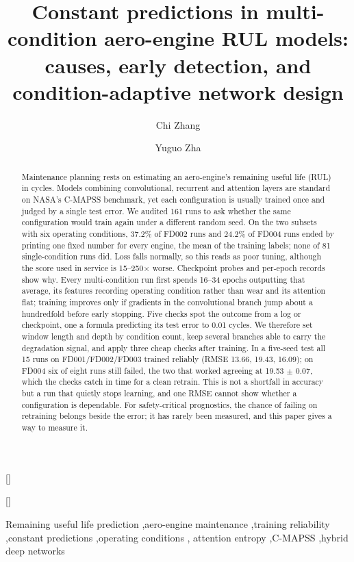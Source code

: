 
\title[mode=title]{Constant predictions in multi-condition aero-engine RUL
models: causes, early detection, and condition-adaptive network design}

\author[1]{Chi Zhang}[]
\author[1]{Yuguo Zha}[]
\cormark[1]


\begin{abstract}
Maintenance planning rests on estimating an aero-engine's remaining useful
life (RUL) in cycles. Models combining convolutional, recurrent and
attention layers are standard on NASA's C-MAPSS benchmark, yet each
configuration is usually trained once and judged by a single test error.
We audited 161 runs to ask whether the same configuration would train again
under a different random seed. On the two subsets with six operating
conditions, 37.2\% of FD002 runs and 24.2\% of FD004 runs ended by printing
one fixed number for every engine, the mean of the training labels; none of
81 single-condition runs did. Loss falls normally, so this reads as poor
tuning, although the score used in service is 15--250$\times$ worse.
Checkpoint probes and per-epoch records show why. Every multi-condition run
first spends 16--34 epochs outputting that average, its features recording
operating condition rather than wear and its attention flat; training
improves only if gradients in the convolutional branch jump about a
hundredfold before early stopping. Five checks spot the outcome from a log
or checkpoint, one a formula predicting its test error to 0.01 cycles. We
therefore set window length and depth by condition count, keep several
branches able to carry the degradation signal, and apply three cheap checks
after training. In a five-seed test all 15 runs on FD001/FD002/FD003 trained
reliably (RMSE 13.66, 19.43, 16.09); on FD004 six of eight runs still
failed, the two that worked agreeing at 19.53 $\pm$ 0.07, which the checks
catch in time for a clean retrain. This is not a shortfall in accuracy but
a run that quietly stops learning, and one RMSE cannot show whether a
configuration is dependable. For safety-critical prognostics, the chance
of failing on retraining belongs beside the error; it has rarely been
measured, and this paper gives a way to measure it.
\end{abstract}

\begin{keywords}
Remaining useful life prediction \sep aero-engine maintenance \sep training
reliability \sep constant predictions \sep operating conditions \sep
attention entropy \sep C-MAPSS \sep hybrid deep networks
\end{keywords}

\maketitle
